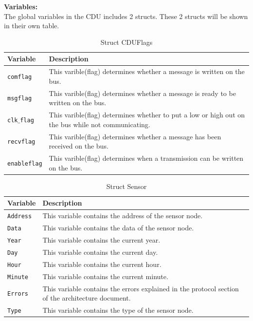 \textbf{Variables:}\\
The global variables in the CDU includes 2 structs. These 2 structs will be shown in their own table.
\begin{table}[H]
\begin{tabular}{|l|p{10cm}|}
\hline
\cellcolor[gray]{0.8}\textbf{Variable} &\cellcolor[gray]{0.8} \textbf{Description}\\ \hline
\texttt{comflag} & This varible(flag) determines whether a message is written on the bus.\\ 
\hline
\texttt{msgflag} & This varible(flag) determines whether a message is ready to be written on the bus.\\ 
\hline
\texttt{clk$\_$flag} & This varible(flag) determines whether to put a low or high out on the bus while not communicating.\\ 
\hline
\texttt{recvflag} & This varible(flag) determines whether a message has been received on the bus.\\ 
\hline
\texttt{enableflag} & This varible(flag) determines when a transmission can be written on the bus.\\ 
\hline
\end{tabular}
\label{tab:structcduflags}
\caption{Struct CDUFlags}
\end{table}

\begin{table}[H]
\begin{tabular}{|l|p{10cm}|}
\hline
\cellcolor[gray]{0.8}\textbf{Variable} &\cellcolor[gray]{0.8} \textbf{Description}\\ \hline
\texttt{Address} & This variable contains the address of the sensor node.\\ 
\hline
\texttt{Data} & This variable contains the data of the sensor node.\\ 
\hline
\texttt{Year} & This variable contains the current year.\\ 
\hline
\texttt{Day} & This variable contains the current day.\\ 
\hline
\texttt{Hour} & This variable contains the current hour.\\ 
\hline
\texttt{Minute} & This variable contains the current minute.\\ 
\hline
\texttt{Errors} & This variable contains the errors explained in the protocol section of the architecture document.\\ 
\hline
\texttt{Type} & This variable contains the type of the sensor node.\\ 
\hline
\end{tabular}
\label{tab:structsensor}
\caption{Struct Sensor}
\end{table}

